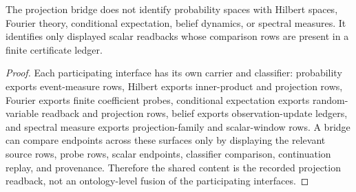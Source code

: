 \begin{theorem}
\label{thm:philosophy-projection-bridge-cannot-claim-boundary}
The projection bridge does not identify probability spaces with Hilbert
spaces, Fourier theory, conditional expectation, belief dynamics, or spectral
measures. It identifies only displayed scalar readbacks whose comparison rows
are present in a finite certificate ledger.
\end{theorem}
\begin{proof}
Each participating interface has its own carrier and classifier: probability
exports event-measure rows, Hilbert exports inner-product and projection
rows, Fourier exports finite coefficient probes, conditional expectation
exports random-variable readback and projection rows, belief exports
observation-update ledgers, and spectral measure exports projection-family
and scalar-window rows. A bridge can compare endpoints across these surfaces
only by displaying the relevant source rows, probe rows, scalar endpoints,
classifier comparison, continuation replay, and provenance. Therefore the
shared content is the recorded projection readback, not an ontology-level
fusion of the participating interfaces.
\end{proof}

